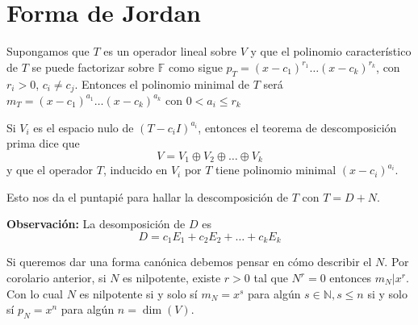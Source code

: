 \newpage

\section{Forma de Jordan}

Supongamos que $T$ es un operador lineal sobre $V$ y
que el polinomio característico de $T$ se puede factorizar
sobre $\mathbb{F}$ como sigue $p_T=(x-c_1)^{r_1}\dots (x-c_k)^{r_k}$,
con $r_i>0$, $c_i\not = c_j$. Entonces el polinomio minimal
de $T$ será $m_T=(x-c_1)^{a_1}\dots (x-c_k)^{a_k}$
con $0<a_i\leq r_k$

Si $V_i$ es el espacio nulo de $(T-c_iI)^{a_i}$, entonces
el teorema de descomposición prima dice que
$$V=V_1\oplus V_2 \oplus \dots \oplus V_k$$
y que el operador $T$, inducido en $V_i$ por $T$ tiene
polinomio minimal $(x - c_i)^{a_i}$.

Esto nos da el puntapié para hallar la descomposición de $T$
con $T=D+N$.

\textbf{Observación:} La desomposición de $D$ es
$$D = c_1E_1 + c_2E_2 + \dots + c_kE_k$$

Si queremos dar una forma canónica debemos pensar en cómo
describir el $N$. Por corolario anterior, si $N$ es nilpotente,
existe $r>0$ tal que $N^{r}=0$ entonces $m_N|x^{r}$. Con lo cual
$N$ es nilpotente si y solo sí
$m_N=x^{s}$ para algún $s\in \mathbb{N}, s\leq n$ si y solo sí
$p_N=x^{n}$ para algún $n=\dim(V)$.

